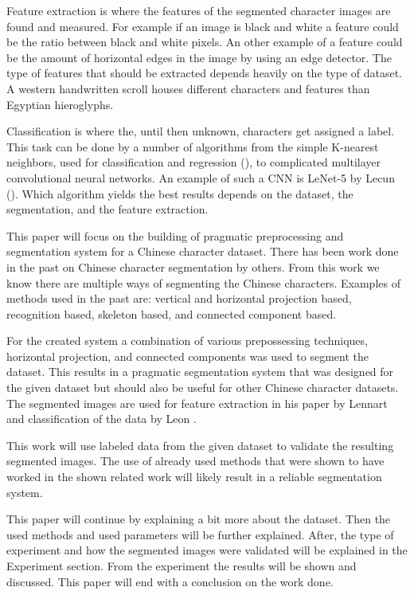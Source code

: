 Feature extraction is where the features of the segmented character images are found and measured. For example if an image is black and white a feature could be the ratio between black and white pixels. An other example of a feature could be the amount of horizontal edges in the image by using an edge detector. The type of features that should be extracted depends heavily on the type of dataset. A western handwritten scroll houses different characters and features than Egyptian hieroglyphs.

Classification is where the, until then unknown, characters get assigned a label. This task can be done by a number of algorithms from the simple K-nearest neighbors, used for classification and regression (\cite{knn}), to complicated multilayer convolutional neural networks. An example of such a CNN is LeNet-5 by Lecun (\cite{lecun}). Which algorithm yields the best results depends on the dataset, the segmentation, and the feature extraction.

This paper will focus on the building of pragmatic preprocessing and segmentation system for a Chinese character dataset. There has been work done in the past on Chinese character segmentation by others. From this work we know there are multiple ways of segmenting the Chinese characters. Examples of methods used in the past are: vertical and horizontal projection based, recognition based, skeleton based, and connected component based.





For the created system a combination of various prepossessing techniques, horizontal projection, and connected components was used to segment the dataset. This results in a pragmatic segmentation system that was designed for the given dataset but should also be useful for other Chinese character datasets. The segmented images are used for feature extraction in his paper by Lennart  and classification of the data by Leon .

This work will use labeled data from the given dataset to validate the resulting segmented images. The use of already used methods that were shown to have worked in the shown related work will likely result in a reliable segmentation system.

This paper will continue by explaining a bit more about the dataset. Then the used methods and used parameters will be further explained. After, the type of experiment and how the segmented images were validated will be explained in the Experiment section. From the experiment the results will be shown and discussed. This paper will end with a conclusion on the work done.

